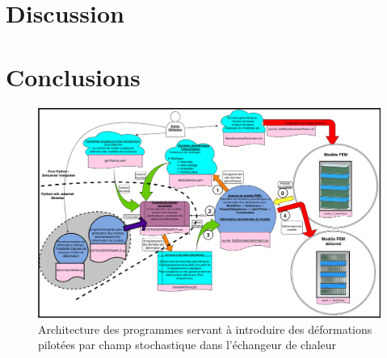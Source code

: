\documentclass[a4paper,10pt]{article}
\begin{document}
\section{Discussion}

\section{Conclusions}




\appendix 
\appendixpage
\addappheadtotoc

\begin{figure}[H]
   \centering
   \vspace{-2cm}
   \includegraphics[angle=-90,origin=c,width=1.1\textwidth,height=1.1\textheight,keepaspectratio]{SchemaDeformationNastran.jpg}
      \caption{Architecture des programmes servant à introduire des déformations pilotées par champ stochastique dans l'échangeur de chaleur}
         \label{SchemaDeformationNastran}
\end{figure}
\end{document}
